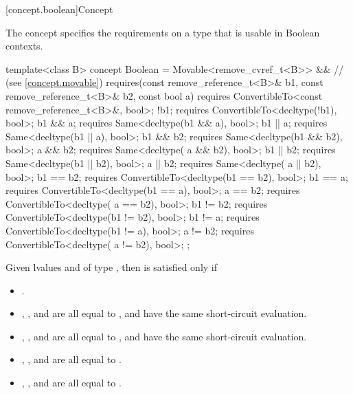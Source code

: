 [concept.boolean]{Concept }

\pnum
The  concept specifies the requirements on a type that is
usable in Boolean contexts.

%
\begin{itemdecl}
template<class B>
  concept Boolean =
    Movable<remove_cvref_t<B>> && // (see \ref{concept.movable})
    requires(const remove_reference_t<B>& b1,
             const remove_reference_t<B>& b2, const bool a) {
      requires ConvertibleTo<const remove_reference_t<B>&, bool>;
      !b1;      requires ConvertibleTo<decltype(!b1), bool>;
      b1 &&  a; requires Same<decltype(b1 &&  a), bool>;
      b1 ||  a; requires Same<decltype(b1 ||  a), bool>;
      b1 && b2; requires Same<decltype(b1 && b2), bool>;
       a && b2; requires Same<decltype( a && b2), bool>;
      b1 || b2; requires Same<decltype(b1 || b2), bool>;
       a || b2; requires Same<decltype( a || b2), bool>;
      b1 == b2; requires ConvertibleTo<decltype(b1 == b2), bool>;
      b1 ==  a; requires ConvertibleTo<decltype(b1 ==  a), bool>;
       a == b2; requires ConvertibleTo<decltype( a == b2), bool>;
      b1 != b2; requires ConvertibleTo<decltype(b1 != b2), bool>;
      b1 !=  a; requires ConvertibleTo<decltype(b1 !=  a), bool>;
       a != b2; requires ConvertibleTo<decltype( a != b2), bool>;
    };
\end{itemdecl}

\pnum
Given lvalues  and  of type
,
then  is satisfied only if

\begin{itemize}
\item {}.
\item {}, , and
       are all equal to
      , and have the same short-circuit
      evaluation.
\item {}, , and
       are all equal to
      , and have the same short-circuit
      evaluation.
\item {}, , and
       are all equal to
      .
\item {}, , and
       are all equal to
      .
\end{itemize}

